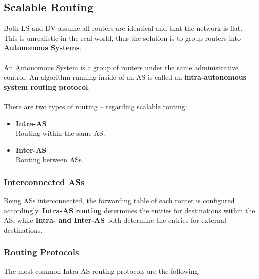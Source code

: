 \documentclass{article}
\begin{document}
\subsection{Scalable Routing}
Both LS and DV assume all routers are identical and that the network is flat. This is unrealistic in the real world, thus the solution is to group routers into \textbf{Autonomous Systems}. \\ \\
An Autonomous System is a group of routers under the same administrative control. An algorithm running inside of an AS is called an \textbf{intra-autonomous system routing protocol}. \\ \\
There are two types of routing -- regarding scalable routing:
\begin{itemize}
	\item \textbf{Intra-AS}
	\vspace{.2cm} \\
	Routing within the same AS.
	
	\item \textbf{Inter-AS}
	\vspace{.2cm} \\
	Routing between ASs.
\end{itemize}

\subsubsection{Interconnected ASs}
Being ASs interconnected, the forwarding table of each router is configured accordingly. \textbf{Intra-AS routing} determines the entries for destinations within the AS, while \textbf{Intra- and Inter-AS} both determine the entries for external destinations.

\subsubsection{Routing Protocols}
The most common Intra-AS routing protocols are the following:
\end{document}
